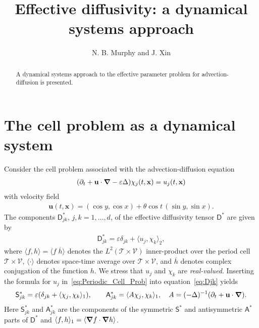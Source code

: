 \documentclass{article}
\newcommand\bnabla{\mbox{\boldmath${\nabla}$}}
\newcommand{\Tc}{\mathcal{T}}
\newcommand{\Vc}{\mathcal{V}}
\newcommand{\Sm}{\mathsf{S}}
\newcommand{\Am}{\mathsf{A}}
\newcommand{\Dm}{\mathsf{D}}
\newcommand{\vecx}{\mathbf{x}}
\newcommand{\vecu}{\mathbf{u}}
\begin{document}
\title{Effective diffusivity: a dynamical systems approach}
\author{N. B. Murphy and J. Xin}
\date{}
\maketitle
\begin{abstract}
A dynamical systems approach to the effective parameter problem for
advection-diffusion is presented.

\end{abstract}
\bigskip
 
\section{The cell problem as a dynamical system }
%
Consider the cell problem associated with the advection-diffusion
equation
%
\begin{align}\label{eq:Periodic_Cell_Prob}
  (\partial_t+\vecu\cdot\bnabla-\varepsilon\Delta)\chi_j(t,\vecx)=u_j(t,\vecx)
\end{align}
%
with velocity field
%
\begin{align}\label{eq:velocity_field_delta}
\vecu(t,\vecx)%
       =(\cos y,\cos x)+\theta\cos t \,(\sin y,\sin x).       
\end{align}
%
The components $\Dm^*_{jk}$, $j,k=1,\ldots,d$, of the effective diffusivity
tensor $\Dm^*$ are given 
by         
%
\begin{align}\label{eq:Djk}
  \Dm^*_{jk}=\varepsilon\delta_{jk}+\langle u_j,\chi_k\rangle_2,
\end{align}
%
where $\langle f,h\rangle=\langle f\; \overline{h}\rangle$ denotes the $L^2(\Tc\times\Vc)$
inner-product over the period cell $\Tc\times\Vc$, $\langle\cdot\rangle$ denotes space-time
average over $\Tc\times\Vc$, and $\overline{h}$ denotes complex conjugation
of the function $h$. We stress that $u_j$ and $\chi_k$ are
\emph{real-valued}. Inserting the formula for $u_j$
in~\eqref{eq:Periodic_Cell_Prob} into equation~\eqref{eq:Djk} yields 
%
\begin{align}\label{eq:Eff_Diffusivity_Sobolev}
  \Sm^*_{jk}=\varepsilon(\delta_{jk}+\langle\chi_j,\chi_k\rangle_1),
  \qquad
  \Am^*_{jk}=\langle A\chi_j,\chi_k\rangle_1,
  \quad
  A=(-\Delta)^{-1}(\partial_t+\vecu\cdot\bnabla).
\end{align}
%
Here $\Sm^*_{jk}$ and $\Am^*_{jk}$ are the components of the symmetric
$\Sm^*$ and antisymmetric $\Am^*$ parts of $\Dm^*$ and
$\langle f,h\rangle_1=\langle\bnabla f\cdot\bnabla h\rangle$.
\end{document}
